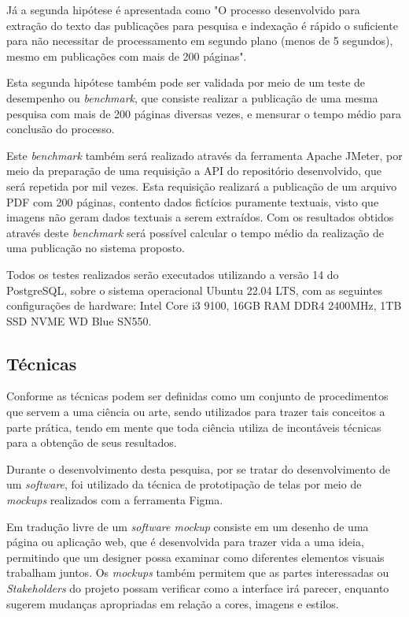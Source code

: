 Já a segunda hipótese é apresentada como "O processo desenvolvido
para extração do texto das publicações para pesquisa e indexação
é rápido o suficiente para não necessitar de processamento em
segundo plano (menos de 5 segundos), mesmo em publicações com mais
de 200 páginas".

Esta segunda hipótese também pode ser validada por meio de um teste de desempenho
ou \emph{benchmark}, que consiste realizar a publicação de uma mesma pesquisa
com mais de 200 páginas diversas vezes, e mensurar o tempo médio para conclusão
do processo.

Este \emph{benchmark} também será realizado através da ferramenta Apache JMeter,
por meio da preparação de uma requisição a API do repositório desenvolvido, que será
repetida por mil vezes. Esta requisição realizará a publicação de um arquivo PDF com
200 páginas, contento dados fictícios puramente textuais, visto que imagens não geram
dados textuais a serem extraídos. Com os resultados obtidos através deste \emph{benchmark}
será possível calcular o tempo médio da realização de uma publicação no sistema proposto.

Todos os testes realizados serão executados utilizando
a versão 14 do PostgreSQL, sobre o sistema operacional Ubuntu 22.04 LTS,
com as seguintes configurações de hardware: Intel Core i3 9100, 16GB RAM DDR4 2400MHz,
1TB SSD NVME WD Blue SN550.

\subsection{Técnicas}

Conforme \citep[p. 174]{LAKATOS2003:metodologia} as técnicas podem
ser definidas como um conjunto de procedimentos que servem a
uma ciência ou arte, sendo utilizados para trazer tais
conceitos a parte prática, tendo em mente que toda ciência utiliza
de incontáveis técnicas para a obtenção de seus resultados.

Durante o desenvolvimento desta pesquisa, por se tratar do
desenvolvimento de um \emph{software}, foi utilizado da técnica
de prototipação de telas por meio de \emph{mockups} realizados
com a ferramenta Figma.

Em tradução livre de \cite{uzayr:mockups} um \emph{software mockup}
consiste em um desenho de uma página ou aplicação web,
que é desenvolvida para trazer vida a uma ideia, permitindo
que um designer possa examinar como diferentes elementos visuais
trabalham juntos. Os \emph{mockups} também permitem que as partes
interessadas ou \emph{Stakeholders} do projeto possam verificar como a
interface irá parecer, enquanto sugerem mudanças
apropriadas em relação a cores, imagens e estilos.

